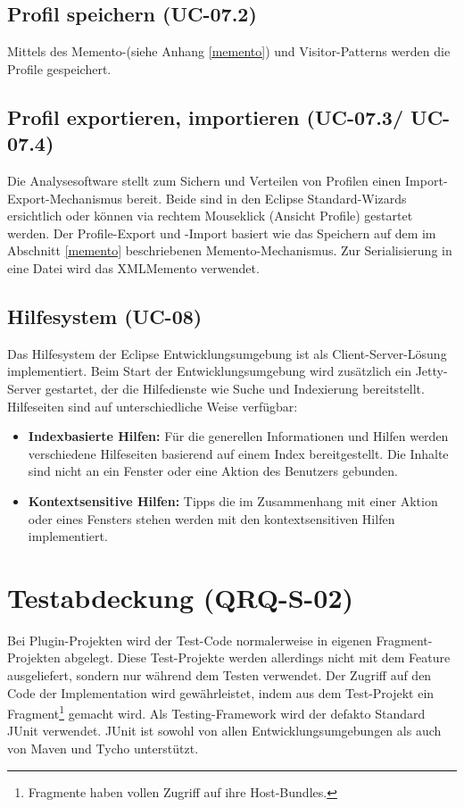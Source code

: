 \subsection{Profil speichern (UC-07.2)}
Mittels des Memento-(siehe Anhang \ref{memento}) und Visitor-Patterns\cite[S. 331]{gamma1995design} werden die Profile gespeichert.

\subsection{Profil exportieren, importieren (UC-07.3/ UC-07.4)}
Die Analysesoftware stellt zum Sichern und Verteilen von Profilen einen Import-Export-Mechanismus bereit. Beide sind in den Eclipse Standard-Wizards ersichtlich oder können via rechtem Mouseklick (Ansicht Profile) gestartet werden. Der Profile-Export und -Import basiert wie das Speichern auf dem im Abschnitt \ref{memento} beschriebenen Memento-Mechanismus. Zur Serialisierung in eine Datei wird das XMLMemento verwendet. 

\subsection{Hilfesystem (UC-08)}
Das Hilfesystem der Eclipse Entwicklungsumgebung ist als Client-Server-Lösung implementiert. Beim Start der Entwicklungsumgebung wird zusätzlich ein Jetty-Server gestartet, der die Hilfedienste wie Suche und Indexierung bereitstellt. Hilfeseiten sind auf unterschiedliche Weise verfügbar:
\begin{itemize}
\item \textbf{Indexbasierte Hilfen:} Für die generellen Informationen und Hilfen werden verschiedene Hilfeseiten basierend auf einem Index bereitgestellt. Die Inhalte sind nicht an ein Fenster oder eine Aktion des Benutzers gebunden. 
\item \textbf{Kontextsensitive Hilfen:} Tipps die im Zusammenhang mit einer Aktion oder eines Fensters stehen werden mit den kontextsensitiven Hilfen implementiert.
\end{itemize}

\section{Testabdeckung (QRQ-S-02)}\label{testing}
Bei Plugin-Projekten wird der Test-Code normalerweise in eigenen Fragment-Projekten abgelegt. Diese Test-Projekte werden allerdings nicht mit dem Feature ausgeliefert, sondern nur während dem Testen verwendet. Der Zugriff auf den Code der Implementation wird gewährleistet, indem aus dem Test-Projekt ein Fragment\footnote{Fragmente haben vollen Zugriff auf ihre Host-Bundles.} gemacht wird. Als Testing-Framework wird der defakto Standard JUnit verwendet. JUnit ist sowohl von allen Entwicklungsumgebungen als auch von Maven und Tycho unterstützt.

